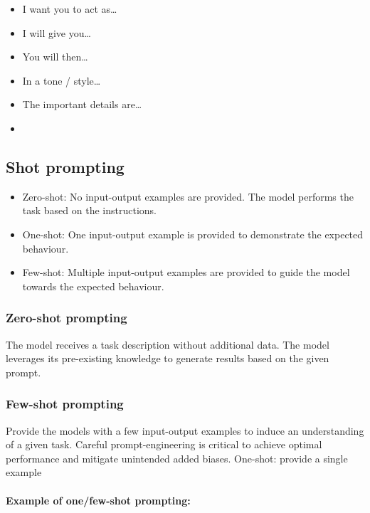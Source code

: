 \begin{itemize}
  \item I want you to act as…
  \item I  will give you…
  \item You will then…
  \item In a tone / style…
  \item The important details are…
  \item [refine the ouputs as needed]
\end{itemize}



\subsection{Shot prompting}

\begin{itemize}
  \item Zero-shot: No input-output examples are provided. The model
        performs the task based on the instructions.

  \item One-shot: One input-output example is provided to demonstrate the
        expected behaviour.

  \item Few-shot: Multiple input-output examples are provided to guide the
        model towards the expected behaviour.
\end{itemize}

\subsubsection{Zero-shot prompting}
The model receives a task description without additional data.
The model leverages its pre-existing knowledge to generate results
based on the given prompt.

\subsubsection{Few-shot prompting}
Provide the models with a few input-output examples to induce an
understanding of a given task.
Careful prompt-engineering is critical to achieve optimal performance
and mitigate unintended added biases.
One-shot: provide a single example

\paragraph{Example of one/few-shot prompting:}

